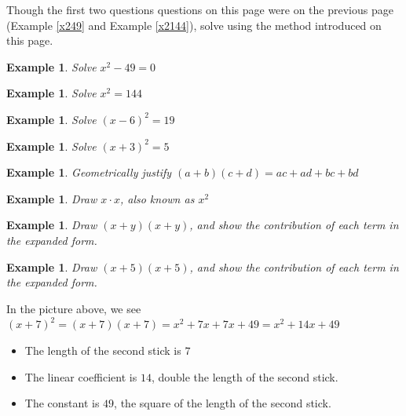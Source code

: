 \documentclass[twoside]{tufte-handout}
\newcounter{ekcounter}%
\theoremstyle{ekimcustom}
\newtheorem{exm}[ekcounter]{Example}
\begin{document}
Though the first two questions questions on this page were on the previous page (Example \ref{x249} and Example \ref{x2144}), solve using the method introduced on this page.
\begin{exm}
Solve $x^2-49=0$
\end{exm}
\vskip10pt

\begin{exm}
Solve $x^2=144$
\end{exm}
\vskip10pt

\begin{exm}
Solve $(x-6)^2=19$
\end{exm}
\vskip10pt


\begin{exm}
Solve $(x+3)^2=5$
\end{exm}
\vskip10pt

\begin{exm}
Geometrically justify $(a+b)(c+d)=ac+ad+bc+bd$
\end{exm}
\vskip10pt

\begin{exm}
Draw $x \cdot x$, also known as $x^2$
\end{exm}
\vskip10pt


\begin{exm}
Draw $(x+y)(x+y)$, and show the contribution of each term in the expanded form.
\end{exm}
\vskip10pt

\begin{exm}
Draw $(x+5)(x+5)$, and show the contribution of each term in the expanded form.
\end{exm}
\vskip10pt




In the picture above, we see\\ $(x+7)^2 = (x+7)(x+7) = x^2 + 7x + 7x + 49 = x^2+14x + 49$
\begin{bconcept}{}{}
\begin{itemize}
\item The length of the second stick is $7$
\item The linear coefficient is $14$, double the length of the second stick.
\item The constant is $49$, the square of the length of the second stick.
\end{itemize}
\end{bconcept}
\end{document}
